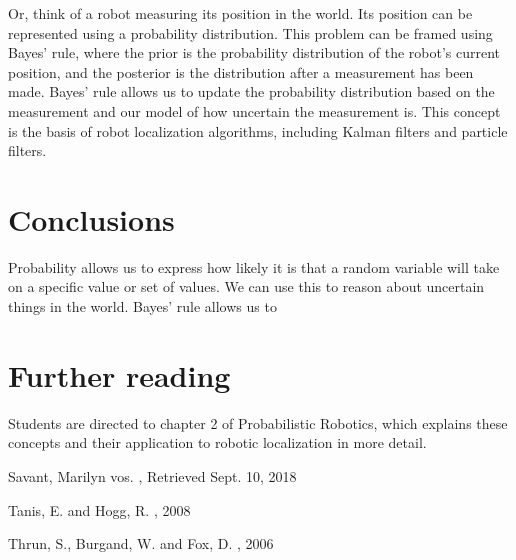 \documentclass[12pt]{article} %
\begin{document}
Or, think of a robot measuring its position in the world.  Its position can be represented using a probability distribution.  This problem can be framed using Bayes' rule, where the prior is the probability distribution of the robot's current position, and the posterior is the distribution after a measurement has been made.  Bayes' rule allows us to update the probability distribution based on the measurement and our model of how uncertain the measurement is.  This concept is the basis of robot localization algorithms, including Kalman filters and particle filters.

\section{Conclusions}

Probability allows us to express how likely it is that a random variable will take on a specific value or set of values.  We can use this to reason about uncertain things in the world.  Bayes' rule allows us to 

\section{Further reading}
Students are directed to chapter 2 of Probabilistic Robotics, which explains these concepts and their application to robotic localization in more detail.



\begin{thebibliography}{99} %
Savant, Marilyn vos.
, Retrieved Sept. 10, 2018

Tanis, E. and Hogg, R.
, 2008

Thrun, S., Burgand, W. and Fox, D.
, 2006
 

 
\end{thebibliography}

\end{document}
